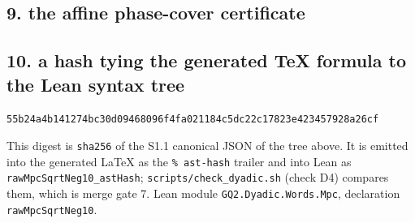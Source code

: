 \subsection{9. the affine phase-cover certificate}

\subsection{10. a hash tying the generated TeX formula to the Lean syntax tree}
\begin{center}\texttt{55b24a4b141274bc30d09468096f4fa021184c5dc22c17823e423457928a26cf}\end{center}
This digest is \texttt{sha256} of the S1.1 canonical JSON of the tree above.  It is emitted into the generated \LaTeX{} as the \texttt{\% ast-hash} trailer and into Lean as \texttt{rawMpcSqrtNeg10\_astHash}; \texttt{scripts/check\_dyadic.sh} (check D4) compares them, which is merge gate 7.
Lean module \texttt{GQ2.Dyadic.Words.Mpc}, declaration \texttt{rawMpcSqrtNeg10}.

